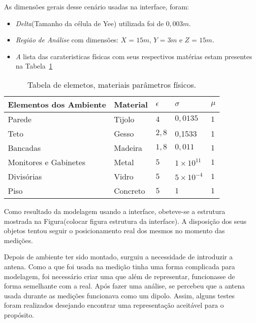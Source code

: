 As dimensões gerais desse cenário usadas na interface, foram:
\begin{itemize}
\item \textit{Delta}(Tamanho da célula de Yee) utilizada foi de $0,003m$.
\item \textit{Região de Análise} com dimensões: $X$ = $15m$, $Y$ = $3m$ e $Z$ = $15m$.
\item \textit A lista das carateristicas físicas com seus respectivos matérias estam presentes na Tabela~\ref{tab:materiais}
\end{itemize}

\begin{table}
\centering
	\begin{tabular}{|l|l|l|l|l|}
	\hline
	Elementos dos Ambiente & Material & $\epsilon$ & $\sigma$ & $\mu$ \\ \hline
	Parede & Tijolo & $4$ & $0,0135$ & $1$\\ \hline
	Teto & Gesso & $2,8$ & 0,1533 & 1 \\ \hline
	Bancadas & Madeira & $1,8$ & $0,011$ & $1$\\ \hline
	Monitores e Gabinetes & Metal & $5$ & $1\times10^{11}$ & $1$\\ \hline
	Divisórias & Vidro & $5$ & $5\times10^{-4}$ & $1$ \\ \hline
	Piso & Concreto & $5$ & $1$ & $1$ \\
	\hline
	\end{tabular}
	\caption{Tabela de elemetos, materiais parâmetros físicos.}
	\label{tab:materiais}
\end{table}

Como resultado da modelagem usando a interface, obeteve-se a estrutura mostrada na Figura(colocar figura estrutura da interface). A disposição dos seus objetos tentou seguir o posicionamento real dos mesmos no momento das medições.


Depois de ambiente ter sido montado, surguiu a necessidade de introduzir a antena. Como a que foi usada na medição tinha uma forma complicada para modelagem, foi necessário criar uma que além de representar, funcionasse de forma semelhante com a real. Após fazer uma análise, se percebeu que a antena usada  durante as medições funcionava como um dipolo. Assim, alguns testes foram realizados desejando encontrar uma representação aceitável para o propósito.\\

